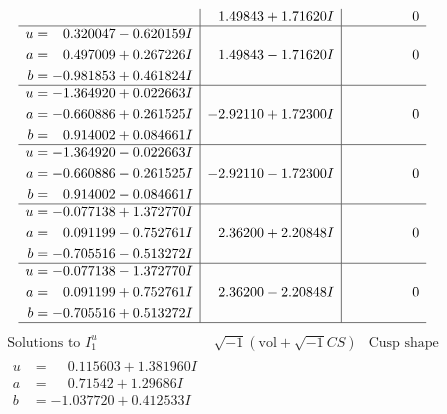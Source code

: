 \documentclass[1p]{elsarticle_modified}
\theoremstyle{definition}
\newcommand{\I}{\sqrt{-1}}
\begin{document}
$$\begin{array}{c|c|c}
 & \phantom{-}1.49843 + 1.71620 I & \phantom{-0.000000 } 0 \\ \hline\begin{aligned}
u &= \phantom{-}0.320047 - 0.620159 I \\
a &= \phantom{-}0.497009 + 0.267226 I \\
b &= -0.981853 + 0.461824 I\end{aligned}
 & \phantom{-}1.49843 - 1.71620 I & \phantom{-0.000000 } 0 \\ \hline\begin{aligned}
u &= -1.364920 + 0.022663 I \\
a &= -0.660886 + 0.261525 I \\
b &= \phantom{-}0.914002 + 0.084661 I\end{aligned}
 & -2.92110 + 1.72300 I & \phantom{-0.000000 } 0 \\ \hline\begin{aligned}
u &= -1.364920 - 0.022663 I \\
a &= -0.660886 - 0.261525 I \\
b &= \phantom{-}0.914002 - 0.084661 I\end{aligned}
 & -2.92110 - 1.72300 I & \phantom{-0.000000 } 0 \\ \hline\begin{aligned}
u &= -0.077138 + 1.372770 I \\
a &= \phantom{-}0.091199 - 0.752761 I \\
b &= -0.705516 - 0.513272 I\end{aligned}
 & \phantom{-}2.36200 + 2.20848 I & \phantom{-0.000000 } 0 \\ \hline\begin{aligned}
u &= -0.077138 - 1.372770 I \\
a &= \phantom{-}0.091199 + 0.752761 I \\
b &= -0.705516 + 0.513272 I\end{aligned}
 & \phantom{-}2.36200 - 2.20848 I & \phantom{-0.000000 } 0\\
 \hline 
 \end{array}$$\newpage$$\begin{array}{c|c|c}  
\text{Solutions to }I^u_{1}& \I (\text{vol} + \sqrt{-1}CS) & \text{Cusp shape}\\
 \hline 
\begin{aligned}
u &= \phantom{-}0.115603 + 1.381960 I \\
a &= \phantom{-}0.71542 + 1.29686 I \\
b &= -1.037720 + 0.412533 I\end{aligned}

\end{array}$$
\end{document}
